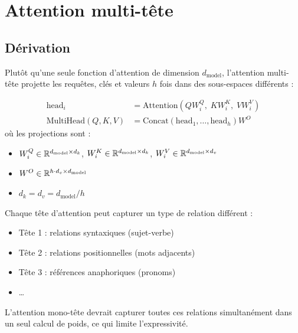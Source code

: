 \section{Attention multi-t\^ete}
\label{sec:multi-head}

\subsection{D\'erivation}

Plut\^ot qu'une seule fonction d'attention de dimension $d_{\text{model}}$,
l'attention multi-t\^ete projette les requ\^etes, cl\'es et valeurs $h$ fois
dans des sous-espaces diff\'erents :

\begin{formules}[title=\textbf{Attention multi-t\^ete}]
\begin{align}
\text{head}_i &= \text{Attention}(Q W_i^Q,\; K W_i^K,\; V W_i^V)
\label{eq:head-i} \\
\text{MultiHead}(Q, K, V) &= \text{Concat}(\text{head}_1, \ldots, \text{head}_h) W^O
\label{eq:multi-head}
\end{align}
o\`u les projections sont :
\begin{itemize}
  \item $W_i^Q \in \mathbb{R}^{d_{\text{model}} \times d_k}$, \quad
        $W_i^K \in \mathbb{R}^{d_{\text{model}} \times d_k}$, \quad
        $W_i^V \in \mathbb{R}^{d_{\text{model}} \times d_v}$
  \item $W^O \in \mathbb{R}^{h \cdot d_v \times d_{\text{model}}}$
  \item $d_k = d_v = d_{\text{model}} / h$
\end{itemize}
\end{formules}

\begin{intuition}[title=\textbf{Pourquoi plusieurs t\^etes ?}]
Chaque t\^ete d'attention peut capturer un type de relation diff\'erent :
\begin{itemize}
  \item T\^ete 1 : relations syntaxiques (sujet-verbe)
  \item T\^ete 2 : relations positionnelles (mots adjacents)
  \item T\^ete 3 : r\'ef\'erences anaphoriques (pronoms)
  \item \ldots
\end{itemize}
L'attention mono-t\^ete devrait capturer toutes ces relations
simultan\'ement dans un seul calcul de poids, ce qui limite
l'expressivit\'e.
\end{intuition}

